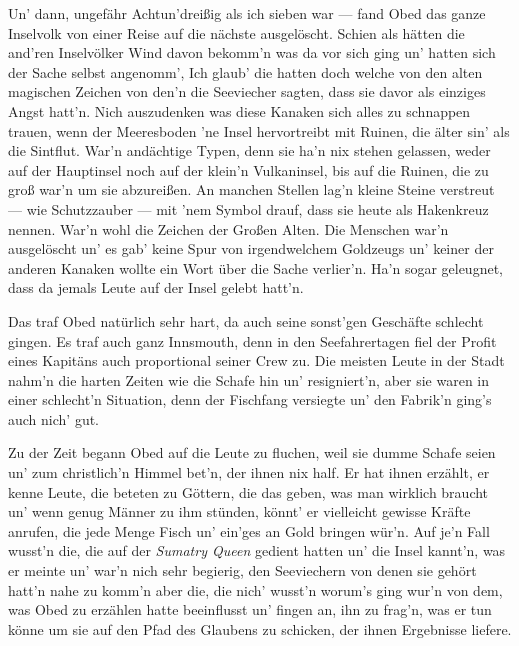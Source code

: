 Un' dann, ungefähr Achtun'dreißig als ich sieben war --- fand Obed das ganze Inselvolk von einer Reise auf die nächste ausgelöscht. Schien als hätten die and'ren Inselvölker Wind davon bekomm'n was da vor sich ging un' hatten sich der Sache selbst angenomm', Ich glaub' die hatten doch welche von den alten magischen Zeichen von den'n die Seeviecher sagten, dass sie davor als einziges Angst hatt'n. Nich auszudenken was diese Kanaken sich alles zu schnappen trauen, wenn der Meeresboden 'ne Insel hervortreibt mit Ruinen, die älter sin' als die Sintflut. War'n andächtige Typen, denn sie ha'n nix stehen gelassen, weder auf der Hauptinsel noch auf der klein'n Vulkaninsel, bis auf die Ruinen, die zu groß war'n um sie abzureißen. An manchen Stellen lag'n kleine Steine verstreut --- wie Schutzzauber --- mit 'nem Symbol drauf, dass sie heute als Hakenkreuz nennen. War'n wohl die Zeichen der Großen Alten. Die Menschen war'n ausgelöscht un' es gab' keine Spur von irgendwelchem Goldzeugs un' keiner der anderen Kanaken wollte ein Wort über die Sache verlier'n. Ha'n sogar geleugnet, dass da jemals Leute auf der Insel gelebt hatt'n.

Das traf Obed natürlich sehr hart, da auch seine sonst'gen Geschäfte schlecht gingen. Es traf auch ganz Innsmouth, denn in den Seefahrertagen fiel der Profit eines Kapitäns auch proportional seiner Crew zu. Die meisten Leute in der Stadt nahm'n die harten Zeiten wie die Schafe hin un' resigniert'n, aber sie waren in einer schlecht'n Situation, denn der Fischfang versiegte un' den Fabrik'n ging's auch nich' gut.

Zu der Zeit begann Obed auf die Leute zu fluchen, weil sie dumme Schafe seien un' zum christlich'n Himmel bet'n, der ihnen nix half. Er hat ihnen erzählt, er kenne Leute, die beteten zu Göttern, die das geben, was man wirklich braucht un' wenn genug Männer zu ihm stünden, könnt' er vielleicht gewisse Kräfte anrufen, die jede Menge Fisch un' ein'ges an Gold bringen wür'n. Auf je'n Fall wusst'n die, die auf der \textit{Sumatry Queen} gedient hatten un' die Insel kannt'n, was er meinte un' war'n nich sehr begierig, den Seeviechern von denen sie gehört hatt'n nahe zu komm'n aber die, die nich' wusst'n worum's ging wur'n von dem, was Obed zu erzählen hatte beeinflusst un' fingen an, ihn zu frag'n, was er tun könne um sie auf den Pfad des Glaubens zu schicken, der ihnen Ergebnisse liefere.\grqq

